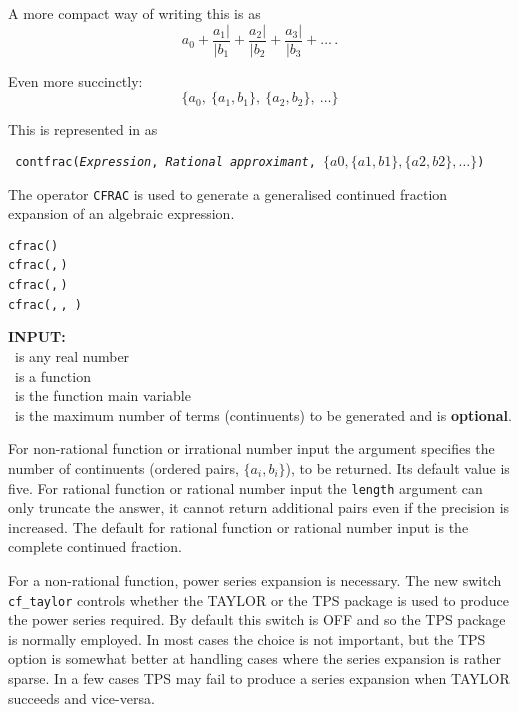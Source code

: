 A more compact way of writing this is as
\[a_0 + \frac{a_1|}{|b_1} + \frac{a_2|}{|b_2} + \frac{a_3|}{|b_3} + \ldots\,.\]

Even more succinctly:
\[\{a_0,\ \{a_1, b_1\},\ \{a_2, b_2\},\ \ldots\}\]

%
This is represented in {\REDUCE} as
\begin{center}\tt
  contfrac(\textsl{Expression},
    \textsl{Rational approximant},
                $\{a0, \{a1,b1\}, \{a2,b2\}, \dots\}$)
\end{center}

\hypertarget{CFRAC:operator}{}
The operator \texttt{CFRAC} is used to generate a generalised continued
fraction expansion of an algebraic expression.

\begin{syntaxtable}
  \texttt{cfrac(}\texttt{)}\\
  \texttt{cfrac(}\texttt{,}\,\texttt{)}\\
  \texttt{cfrac(}\texttt{,}\,\texttt{)}\\
  \texttt{cfrac(}\texttt{,}\,\texttt{,}\,%
  \texttt{)}
\end{syntaxtable}


\textbf{INPUT:}\\
 \ is any real number\\
 \ is a function\\
 \ is the function main variable\\
 \ is the maximum number of terms (continuents) to be
generated and is \textbf{optional}.

For non-rational function or irrational number input the 
argument specifies the number of continuents (ordered pairs, $\{a_i,b_i\}$),
to be returned. Its default value is five.
For rational function or rational number input the
\texttt{length} argument can only truncate the answer, it cannot
return additional pairs even if the precision is increased.
The default for rational function or rational number input is the
complete continued fraction.

\hypertarget{switch:CF_TAYLOR}{}

For a non-rational function, power series expansion is necessary. The new
switch \texttt{cf\_taylor} controls whether the TAYLOR or the TPS package is
used to produce the power series required. By default this switch is OFF and
so the TPS package is normally employed.
In most cases the choice is not important, but the TPS option is somewhat
better at handling cases where the series expansion is rather sparse.
In a few cases TPS may fail to produce a series expansion when TAYLOR succeeds
and vice-versa.

